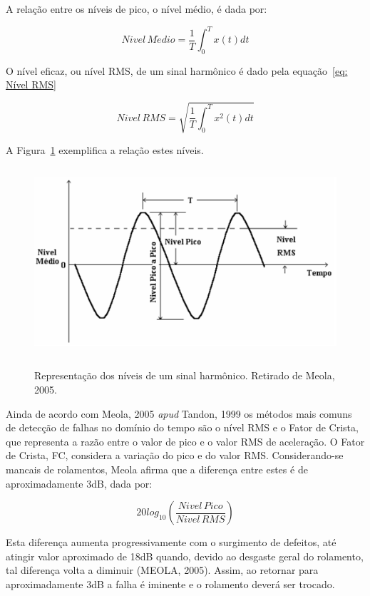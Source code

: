 \documentclass[
	12pt,				
	oneside,			
	a4paper,			
	english,			
	brazil,			
	]{abntex2ppgsi}
\begin{document}
A relação entre os níveis de pico, o nível médio, é dada por:

\begin{equation}
	Nivel \, M\acute{e}dio = \frac{1}{T} \int_{0}^{T} x(t)dt
	\label{eq: Nível Médio}
\end{equation}

O nível eficaz, ou nível RMS, de um sinal harmônico é dado pela equação~\ref{eq: Nível RMS}

\begin{equation}
	Nivel \, RMS = \sqrt{ \frac{1}{T} \int_{0}^{T} x^{2}(t)dt }
	\label{eq: Nível RMS}
\end{equation}

A Figura~\ref{RelacaoSinalHarmonico} exemplifica a relação estes níveis.

\begin{figure}[!htb]
\centering
\caption {Representação dos níveis de um sinal harmônico. Retirado de Meola, 2005.}
\includegraphics[width=\textwidth,height=70mm,keepaspectratio]{Figura17}
\label{RelacaoSinalHarmonico}
\end{figure}

Ainda de acordo com Meola, 2005 \textit{apud} Tandon, 1999 os métodos mais comuns de detecção de falhas no domínio do tempo são o nível RMS e o Fator de Crista, que representa a razão entre o valor de pico e o valor RMS de aceleração. O Fator de Crista, FC, considera a variação do pico e do valor RMS. Considerando-se mancais de rolamentos, Meola afirma que a diferença entre estes é de aproximadamente 3dB, dada por:

\begin{equation}
	20log_{10} \left ( \frac{Nivel \,Pico}{Nivel \, RMS} \right )
	\label{eq: Nível de Pico vs RMS}
\end{equation}

Esta diferença aumenta progressivamente com o surgimento de defeitos, até atingir valor aproximado de 18dB quando, devido ao desgaste geral do rolamento, tal diferença volta a diminuir (MEOLA, 2005). Assim, ao retornar para aproximadamente 3dB a falha é iminente e o rolamento deverá ser trocado. 
\end{document}
